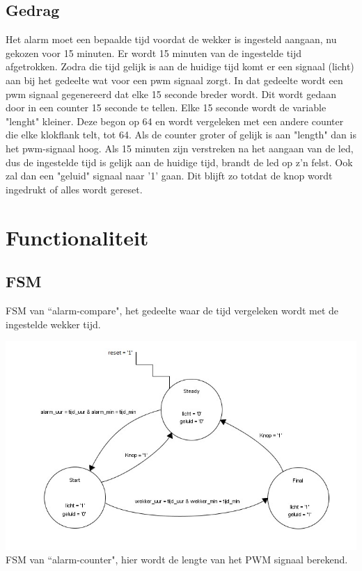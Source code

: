 \subsection{Gedrag}
Het alarm moet een bepaalde tijd voordat de wekker is ingesteld aangaan, nu gekozen voor 15 minuten.
Er wordt 15 minuten van de ingestelde tijd afgetrokken. Zodra die tijd gelijk is aan de huidige tijd komt er een signaal (licht) aan bij het gedeelte wat voor een pwm signaal zorgt.
In dat gedeelte wordt een pwm signaal gegenereerd dat elke 15 seconde breder wordt. Dit wordt gedaan door in een counter 15 seconde te tellen. Elke 15 seconde wordt de variable "lenght" kleiner. Deze begon op 64 en wordt vergeleken met een andere counter die elke klokflank telt, tot 64. Als de counter groter of gelijk is aan "length" dan is het pwm-signaal hoog. 
Als 15 minuten zijn verstreken na het aangaan van de led, dus de ingestelde tijd is gelijk aan de huidige tijd, brandt de led op z'n felst. Ook zal dan een "geluid" signaal naar '1' gaan. Dit blijft zo totdat de knop wordt ingedrukt of alles wordt gereset.
\newpage
\section{Functionaliteit}
\subsection{FSM}
FSM van ``alarm-compare", het gedeelte waar de tijd vergeleken wordt met de ingestelde wekker tijd.

\includegraphics[width=\textwidth,height=\textheight,keepaspectratio]{FSM/alarm-compare-fsm.jpg}
FSM van ``alarm-counter", hier wordt de lengte van het PWM signaal berekend.

